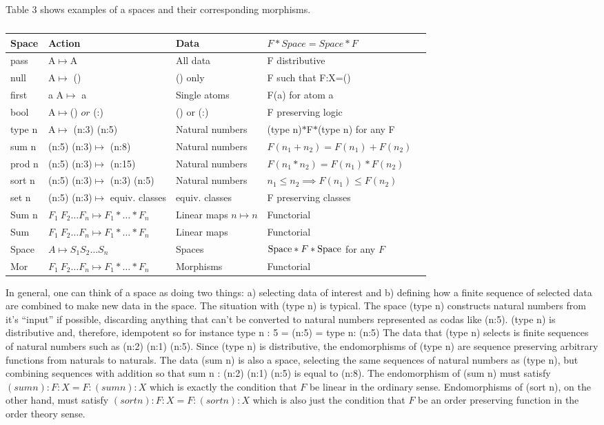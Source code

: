 \documentclass[11pt]{article}
\begin{document}
Table 3 shows examples of a spaces and their corresponding morphisms.  
\begin{table}
\begin{tabular}{| l | l | l | l | l |  }
Space & Action & Data &  $F*Space=Space*F$ \\
\hline 
pass & A$\mapsto$A & All data & F distributive \\
null & A$\mapsto$ () & () only & F such that F:X=() \\
first & a A$\mapsto$ a & Single atoms &  F(a) for atom a \\ 
bool & A$\mapsto$() $or$ (:) & () or (:) &  F preserving logic \\
type n & A$\mapsto$ (n:3) (n:5) & Natural numbers &  (type n)$*$F$*$(type n) for any F \\
sum n & (n:5) (n:3)$\mapsto$ (n:8) & Natural numbers &  $F(n_1+n_2)=F(n_1)+F(n_2)$ \\
prod n & (n:5) (n:3)$\mapsto$ (n:15) & Natural numbers &  $F(n_1*n_2)=F(n_1)*F(n_2)$ \\
sort n & (n:5) (n:3)$\mapsto$ (n:3) (n:5) & Natural numbers & $n_1\le n_2 \implies F(n_1)\le F(n_2)$ \\
set n & (n:5) (n:3)$\mapsto$ equiv. classes & equiv. classes & F preserving classes \\
Sum n & $F_1\ F_2\dots F_n\mapsto F_1*\dots *F_n$ & Linear maps $n\mapsto n$ & Functorial \\
Sum & $F_1\ F_2\dots F_n\mapsto F_1*\dots *F_n$ & Linear maps  & Functorial \\
Space & $A\mapsto S_1 S_2\dots S_n$ & Spaces & ${\rm Space}*F*{\rm Space}$ for any $F$\\
Mor & $F_1\ F_2\dots F_n\mapsto F_1*\dots *F_n$ & Morphisms & Functorial \\
\hline
\end{tabular} 
\caption{\label{Spaces in Coda}}   
\end{table}
In general, one can think of a space as doing two things:  a) selecting data of interest and b) defining how 
a finite sequence of selected data are combined to make new data in the space.  
The situation with (type n) is typical.  The space (type n) constructs natural numbers from it's ``input'' if possible, 
discarding anything that can't be converted to natural numbers represented as codas like (n:5).  (type n) is 
distributive and, therefore, idempotent so for instance type n : 5 = (n:5) = type n: (n:5) 
The data that (type n) selects is finite  
sequences of natural numbers such as (n:2) (n:1) (n:5).  Since (type n) is distributive, the endomorphisms 
of (type n) are sequence preserving arbitrary functions from naturals to naturals.    
The data (sum n) is also a space, selecting the same sequences of  natural numbers as (type n), but combining 
sequences with addition so that sum n : (n:2) (n:1) (n:5) is equal to (n:8).  The endomorphism of (sum n) 
must satisfy $(sum n):F:X = F:(sum n):X$ which is exactly the condition that $F$ be linear in the ordinary sense. 
Endomorphisms of (sort n), on the other hand, must satisfy $(sort n):F:X=F:(sort n):X$ which is also just 
the condition that $F$ be an order preserving function in the order theory sense.  
\end{document}
